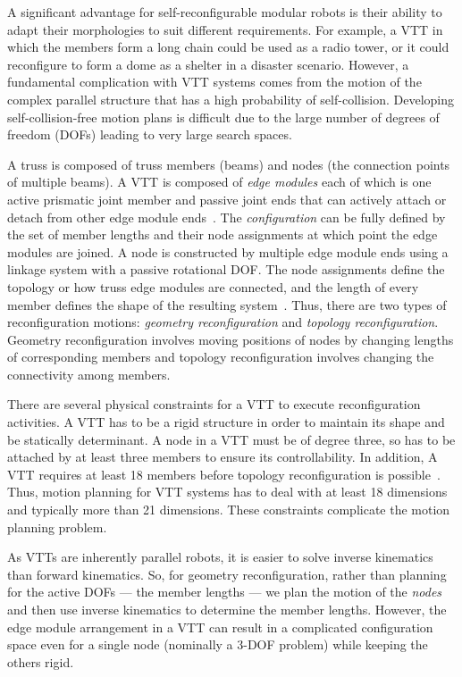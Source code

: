 \documentclass[journal]{IEEEtran}
\begin{document}
A significant advantage for self-reconfigurable modular robots is
their ability to adapt their morphologies to suit different
requirements. For example, a VTT in which the members form a long
chain could be used as a radio tower, or it could reconfigure to form
a dome as a shelter in a disaster scenario. However, a fundamental
complication with VTT systems comes from the motion of the complex
parallel structure that has a high probability of
self-collision. Developing self-collision-free motion plans is
difficult due to the large number of degrees of freedom (DOFs) leading
to very large search spaces.

A truss is composed of truss members (beams) and nodes (the connection
points of multiple beams). A VTT is composed of {\em edge modules}
each of which is one active prismatic joint member and passive joint
ends that can actively attach or detach from other edge module
ends~\cite{Spinos-vtt-iros-2017}. The \textit{configuration} can be
fully defined by the set of member lengths and their node assignments
at which point the edge modules are joined. A node is constructed by
multiple edge module ends using a linkage system with a passive
rotational DOF. The node assignments define the topology or how truss
edge modules are connected, and the length of every member defines the
shape of the resulting system~\cite{Liu-vtt-planning-iros-2019}. Thus,
there are two types of reconfiguration motions: \textit{geometry
  reconfiguration} and \textit{topology reconfiguration}. Geometry
reconfiguration involves moving positions of nodes by changing lengths
of corresponding members and topology reconfiguration involves
changing the connectivity among members.

There are several physical constraints for a VTT to execute
reconfiguration activities. A VTT has to be a rigid structure in order
to maintain its shape and be statically determinant. A node in a VTT
must be of degree three, so has to be attached by at least three
members to ensure its controllability. In addition, A VTT requires at
least 18 members before topology reconfiguration is
possible~\cite{Spinos-vtt-iros-2017}. Thus, motion planning for VTT
systems has to deal with at least 18 dimensions and typically more
than 21 dimensions. These constraints complicate the motion planning
problem.

As VTTs are inherently parallel robots, it is easier to solve inverse
kinematics than forward kinematics. So, for geometry reconfiguration,
rather than planning for the active DOFs --- the member lengths --- we
plan the motion of the \textit{nodes} and then use inverse kinematics
to determine the member lengths. However, the edge module arrangement
in a VTT can result in a complicated configuration space even for a
single node (nominally a 3-DOF problem) while keeping the others
rigid.
\end{document}
